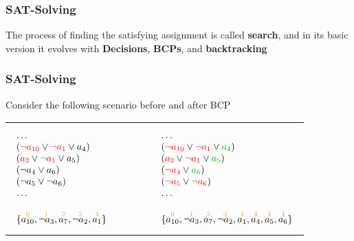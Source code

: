 \begin{frame}
  \frametitle{SAT-Solving}
  
  The process of finding the satisfying assignment is called {\bf search}, and
  in its basic version it evolves with {\bf Decisions}, {\bf BCPs}, and
  {\bf backtracking}

  \begin{center}
  \scalebox{.5}{}
  \end{center}

\end{frame}

\begin{frame}
  \frametitle{SAT-Solving}

  \scriptsize

  Consider the following scenario before and after BCP
  \vfill
  \begin{tabular}{ccc}
  \begin{minipage}{.4\textwidth}
  $$
  \begin{array}{l}
    \ldots \\
    (\colone{\neg a_{10}} \vee \colone{\neg a_1} \vee a_4) \\
    (\colone{a_3} \vee \colone{\neg a_1} \vee a_5) \\
    (\neg a_4 \vee a_6) \\
    (\neg a_5 \vee \neg a_6) \\
    \ldots \\
    \\
    \{ \dec{a_{10}}{0}, \dec{\neg a_3}{1}, \dec{a_7}{2}, \dec{\neg a_2}{3}, \dec{a_1}{4} \}
  \end{array}
  $$
  \end{minipage}
  & ~~~~ &
  \begin{minipage}{.5\textwidth}
  $$
  \begin{array}{l}
    \ldots \\
    (\colone{\neg a_{10}} \vee \colone{\neg a_1} \vee \coltwo{a_4}) \\
    (\colone{a_3} \vee \colone{\neg a_1} \vee \coltwo{a_5}) \\
    (\colone{\neg a_4} \vee \coltwo{a_6}) \\
    (\colone{\neg a_5} \vee \colone{\neg a_6}) \\
    \ldots \\
    \\
    \{ \dec{a_{10}}{0}, \dec{\neg a_3}{1}, \dec{a_7}{2}, \dec{\neg a_2}{3}, \dec{a_1}{4}, \dec{a_4}{4}, \dec{a_5}{4}, \dec{a_6}{4}\}
  \end{array}
$$
\end{minipage}
\end{tabular}
\end{frame}
